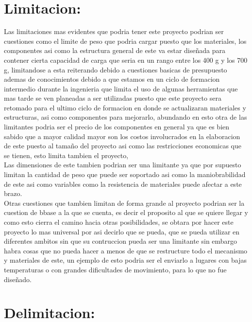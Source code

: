 \documentclass[14pt,a4paper]{article}
\begin{document}
\section{Limitacion:}
Las limitaciones mas evidentes que podria tener este proyecto podrian ser cuestiones como el limite de peso que podria cargar puesto que los materiales, los componentes asi como la estructura general de este va estar diseñada para contener cierta capacidad de carga que seria en un rango entre los 400 g y los 700 g, limitandose a esta reiterando debido a cuestiones basicas de presupuesto ademas de conocimientos debido a que estamos en un ciclo de formacion intermedio durante la ingenieria que limita el uso de algunas herramientas que mas tarde se ven planeadas a ser utilizadas puesto que este proyecto sera retomado para el ultimo ciclo de formacion en donde se actualizaran materiales y estructuras, asi como componentes para mejorarlo, abundando en esto otra de las limitantes podria ser el precio de los componentes en general ya que es bien sabido que a mayor calidad mayor son los costos involucrados en la elaboracion de este puesto al tamaño del proyecto asi como las restricciones economicas que se tienen, esto limita tambien el proyecto,\\
Las dimensiones de este tambien podrian ser una limitante ya que por supuesto limitan la cantidad de peso que puede ser soportado asi como la maniobrabilidad de este asi como variables como la resistencia de materiales puede afectar a este brazo.\\
Otras cuestiones que tambien limitan de forma grande al proyecto podrian ser la cuestion de bbase a la que se cuenta, es decir el proposito al que se quiere llegar y como esto cierra el camino hacia otras posibilidades, se obtara por hacer este proyecto lo mas universal por asi decirlo que se pueda, que se pueda utilizar en diferentes ambitos sin que su contruccion pueda ser una limitante sin embargo habra cosas que no pueda hacer a menos de que se restructure todo el mecanismo y materiales  de este, un ejemplo de esto podria ser el enviarlo a lugares con bajas temperaturas o con grandes dificultades de movimiento, para lo que no fue diseñado.

\section{Delimitacion:}
\end{document}
